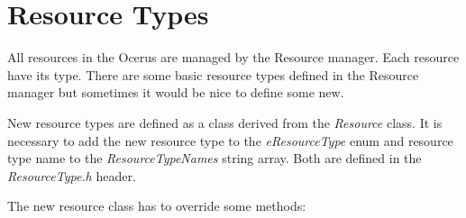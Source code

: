 \documentclass[a4paper, 12pt]{report}
\begin{document}
\chapter{Resource Types}

All resources in the Ocerus are managed by the Resource manager. Each resource have its type. There are some basic resource types defined in the Resource manager but sometimes it would be nice to define some new.

New resource types are defined as a class derived from the \emph{Resource} class. It is necessary to add the new resource type to the \emph{eResourceType} enum and resource type name to the \emph{ResourceTypeNames} string array. Both are defined in the \emph{ResourceType.h} header.

The new resource class has to override some methods:
\end{document}
